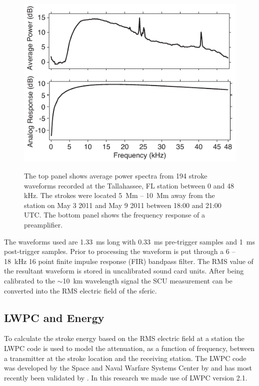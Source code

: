 \begin{figure}[ht!]
\centering
\includegraphics[scale=1]{energy/Figures/PPS_Spectra.pdf}\\
\caption{The top panel shows average power spectra from 194 stroke waveforms recorded at the Tallahassee, FL station between 0 and 48 kHz. The strokes were located 5~Mm -- 10~Mm away from the  station on May 3 2011 and May 9 2011 between 18:00 and 21:00 UTC. 
	The bottom panel shows the frequency response of a preamplifier.}
\label{energy:fig:average_spectra}
\end{figure}

The waveforms used are 1.33~ms long with 0.33~ms pre-trigger samples and 1~ms post-trigger samples.
Prior to processing the waveform is put through a 6 -- 18~kHz 16 point finite impulse response (FIR) bandpass filter.
The RMS value of the resultant waveform is stored in uncalibrated sound card units.
After being calibrated to the $\sim$10~km wavelength signal the SCU measurement can be converted into the RMS electric field of the sferic. 

\subsection{LWPC and Energy}

To calculate the stroke energy based on the RMS electric field at a station the LWPC code is used to model the attenuation, as a function of frequency, between a transmitter at the stroke location and the receiving station.
The LWPC code was developed by the Space and Naval Warfare Systems Center by \citet{Ferguson1998} and has most recently been validated by \citet{Thomson2011}.
In this research we made use of LWPC version 2.1.

